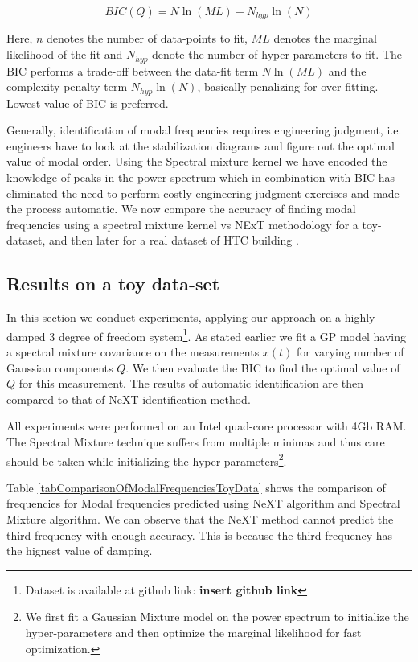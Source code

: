 \begin{mdframed}[hidealllines=true,backgroundcolor=blue!20]
\begin{equation}\label{eq:BIC}
    BIC(Q) = N\ln(ML) + N_{hyp}\ln(N)
\end{equation}

Here, $n$ denotes the number of data-points to fit, $ML$ denotes the marginal likelihood of the fit and $N_{hyp}$ denote the number of hyper-parameters to fit. The BIC performs a trade-off between the data-fit term $N\ln(ML)$ and the complexity penalty term $N_{hyp}\ln(N)$, basically penalizing for over-fitting. Lowest value of BIC is preferred. 
\end{mdframed}

Generally, identification of modal frequencies requires engineering judgment, i.e. engineers have to look at the stabilization diagrams and figure out the optimal value of modal order. Using the Spectral mixture kernel we have encoded the knowledge of peaks in the power spectrum which in combination with BIC has eliminated the need to perform costly engineering judgment exercises and made the process automatic. We now compare the accuracy of finding modal frequencies using a spectral mixture kernel vs NExT \cite{james1995natural} methodology for a toy-dataset, and then later for a real dataset of HTC building \cite{brincker2000modal}.

\subsection{Results on a toy data-set}
In this section we conduct experiments, applying our approach on a highly damped 3 degree of freedom system\footnote{Dataset is available at github link: \textbf{insert github link}}. As stated earlier we fit a GP model having a spectral mixture covariance on the measurements $x(t)$ for varying number of Gaussian components $Q$. We then evaluate the BIC to find the optimal value of $Q$ for this measurement. The results of automatic identification are then compared to that of NeXT identification method. 

All experiments were performed on an Intel quad-core processor with 4Gb RAM. The Spectral Mixture technique suffers from multiple minimas and thus care should be taken while initializing the hyper-parameters\footnote{We first fit a Gaussian Mixture model on the power spectrum to initialize the hyper-parameters and then optimize the marginal likelihood for fast optimization.}.  

Table \ref{tabComparisonOfModalFrequenciesToyData} shows the comparison of frequencies for Modal frequencies predicted using NeXT algorithm and Spectral Mixture algorithm. We can observe that the NeXT method cannot predict the third frequency with enough accuracy. This is because the third frequency has the hignest value of damping.

